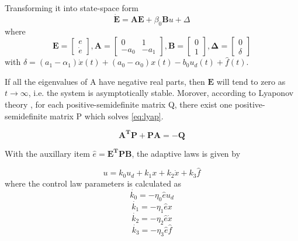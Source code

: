 Transforming it into state-space form
\begin{equation}
  \label{eq:refmodel}
  \mathbf{\dot{E} = AE} + \beta_0\mathbf{B}u + \Delta
\end{equation}
where
\begin{equation}
  \label{eq:matrices}
  \mathbf{E} =
    \begin{bmatrix}
       e\\[0.3em]
       \dot{e}
     \end{bmatrix},
  \mathbf{A} =
    \begin{bmatrix}
       0 & 1\\[0.3em]
       -a_0 & -a_1
     \end{bmatrix},
  \mathbf{B} =
    \begin{bmatrix}
        0\\[0.3em]
        1
    \end{bmatrix},
    \mathbf{\Delta} =
      \begin{bmatrix}
          0\\[0.3em]
          \delta
      \end{bmatrix}
\end{equation}
with $\delta = (a_1-\alpha_1)\dot{x}(t) + (a_0-\alpha_0)x(t) - b_0u_d(t) + \hat{f}(t)$.

If all the eigenvalues of A have negative real parts, then $\mathbf{E}$ will tend to zero as  $t \to \infty$, i.e. the system is asymptotically stable. Morover, according to Lyaponov  theory \cite{Ljung:2003}, for each positive-semidefinite matrix Q, there exist one positive-semidefinite matrix P which solves \eqref{eq:lyap}.

\begin{equation}
  \label{eq:lyap}
  \mathbf{A^TP + PA = -Q}
\end{equation}

With the auxillary item $\hat{e} = \mathbf{E^TPB}$, the adaptive laws is given by

\begin{equation}
  \label{eq:adaplaws}
  u = k_0u_d + k_1x + k_2\dot{x} + k_3\hat{f}
\end{equation}
where the control law parameters is calculated as
\begin{equation}
  \dot{k_0} = -\eta_0\hat{e}u_d
\end{equation}
\begin{equation}
  \dot{k_1} = -\eta_1\hat{e}x
\end{equation}
\begin{equation}
  \dot{k_2} = -\eta_2\hat{e}\dot{x}
\end{equation}
\begin{equation}
  \dot{k_3} = -\eta_3\hat{e}\hat{f}
\end{equation}


